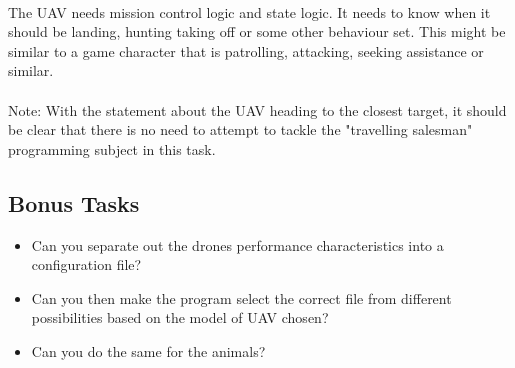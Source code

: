 \documentclass[11pt]{book}
\begin{document}
\paragraph{} The UAV needs mission control logic and state logic. It needs to know when it should be landing, hunting taking off or some other behaviour set. This might be similar to a game character that is patrolling, attacking, seeking assistance or similar.

\paragraph{} Note: With the statement about the UAV heading to the closest target, it should be clear that there is no need to attempt to tackle the "travelling salesman" programming subject in this task.

\subsection{Bonus Tasks}

\begin{itemize}
\item Can you separate out the drones performance characteristics into a configuration file?
\item Can you then make the program select the correct file from different possibilities based on the model of UAV chosen? 
\item Can you do the same for the animals?
\end{itemize}
\end{document}
